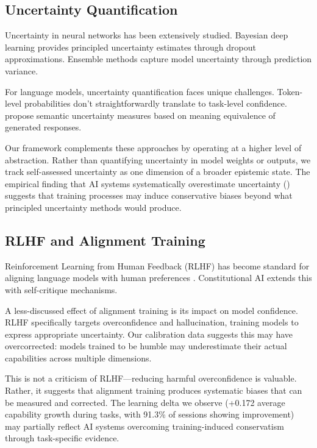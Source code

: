 \subsection{Uncertainty Quantification}

Uncertainty in neural networks has been extensively studied. Bayesian deep learning \citep{gal2016dropout} provides principled uncertainty estimates through dropout approximations. Ensemble methods \citep{lakshminarayanan2017simple} capture model uncertainty through prediction variance.

For language models, uncertainty quantification faces unique challenges. Token-level probabilities don't straightforwardly translate to task-level confidence. \citet{kuhn2023semantic} propose semantic uncertainty measures based on meaning equivalence of generated responses.

Our framework complements these approaches by operating at a higher level of abstraction. Rather than quantifying uncertainty in model weights or outputs, we track self-assessed uncertainty as one dimension of a broader epistemic state. The empirical finding that AI systems systematically overestimate uncertainty () suggests that training processes may induce conservative biases beyond what principled uncertainty methods would produce.

\subsection{RLHF and Alignment Training}

Reinforcement Learning from Human Feedback (RLHF) has become standard for aligning language models with human preferences \citep{ouyang2022training}. Constitutional AI \citep{bai2022constitutional} extends this with self-critique mechanisms.

A less-discussed effect of alignment training is its impact on model confidence. RLHF specifically targets overconfidence and hallucination, training models to express appropriate uncertainty. Our calibration data suggests this may have overcorrected: models trained to be humble may underestimate their actual capabilities across multiple dimensions.

This is not a criticism of RLHF---reducing harmful overconfidence is valuable. Rather, it suggests that alignment training produces systematic biases that can be measured and corrected. The learning delta we observe (+0.172 average capability growth during tasks, with 91.3\% of sessions showing improvement) may partially reflect AI systems overcoming training-induced conservatism through task-specific evidence.

